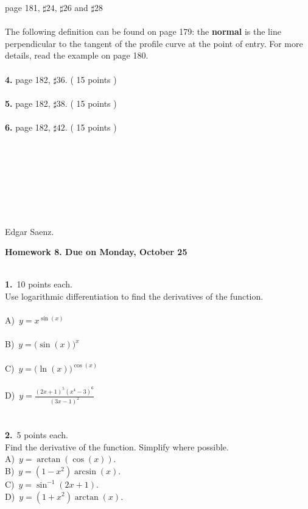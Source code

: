 \documentclass[12pt]{article}
\newcommand{\Frac}{\displaystyle \frac}
\begin{document}
page 181, $\sharp24$, $\sharp26$ and $\sharp28$
\\
\\
The following definition can be found on page 179: the
\textbf{normal} is the line perpendicular to the tangent of the
profile curve at the point of entry. For more details, read the
example on page 180.\\
\\
\textbf{4.} page 182, $\sharp36$. ( 15 points )\\
\\
\textbf{5.} page 182, $\sharp38$. ( 15 points )\\
\\
\textbf{6.} page 182, $\sharp42$. ( 15 points )\\
\\\\\\\\\\\\\\
\begin{flushright}
Edgar Saenz.
\end{flushright}
\newpage
\begin{center}
\textbf{Homework 8. Due on Monday, October 25} \\
\end{center}\
\\
\textbf{1.}\ 10 points each.\\
Use logarithmic differentiation to find the derivatives of the
function.\\
\\
A)\ $y=x^{\sin(x)}$\\
\\
B)\ $y=\Big(\sin(x)\Big)^{x}$\\
\\
C)\ $y=\Big(\ln(x)\Big)^{\cos(x)}$\\
\\
D)\ $y=\Frac{(2x+1)^{5}(x^{4}-3)^{6}}{(3x-1)^{2}}$\\
\\
\\
\textbf{2.}\ 5 points each.\\
Find the derivative of the function. Simplify where possible.\\
A)\ $y=\arctan(\cos(x))$.\\
B)\ $y=(1-x^2)\arcsin(x)$.\\
C)\ $y=\sin^{-1}(2x+1)$.\\
D)\ $y=(1+x^{2})\arctan(x)$.\\
\end{document}
